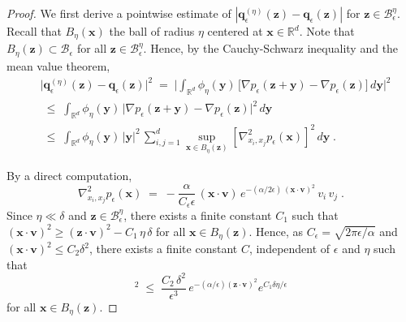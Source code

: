 \documentclass[reqno]{amsart}
\newcounter{as}[section]
\newcommand{\mc}[1]{{\mathcal #1}}
\newcommand{\bb}[1]{{\mathbb #1}}
\newcommand{\bs}[1]{{\boldsymbol #1}}
\newcommand{\<}{\langle}
\renewcommand{\>}{\rangle}
\begin{document}
\begin{proof}
We first derive a pointwise estimate of
$|\bs{q}_{\epsilon}^{(\eta)}(\bs{z}) - \bs{q}_{\epsilon}(\bs{z})|$ for
$\bs{z}\in\mc{B}_{\epsilon}^{\eta}$. Recall that $B_\eta(\bs{x})$ the
ball of radius $\eta$ centered at $\bs{x}\in\bb{R}^{d}$. Note
that $B_\eta(\bs{z})\subset\mc{B}_{\epsilon}$ for all
$\bs{z}\in\mc{B}_{\epsilon}^{\eta}$.  Hence, by the Cauchy-Schwarz
inequality and the mean value theorem,
\begin{equation}
\label{se30}
\begin{aligned}
& \big|\bs{q}_{\epsilon}^{(\eta)}(\bs{z})
-\bs{q}_{\epsilon}(\bs{z})\big|^{2} \;=\;
\Big|\int_{\bb{R}^{d}}\phi_{\eta}(\bs{y})\,
\big[\nabla p_{\epsilon}(\bs{z}+\bs{y})
-\nabla p_{\epsilon}(\bs{z})\big]\, d\bs{y}\Big|^{2} \\
&  \;\le\; \int_{\bb{R}^{d}}\phi_{\eta}(\bs{y})
\, \big|\nabla p_{\epsilon}(\bs{z}+\bs{y})
-\nabla p_{\epsilon}(\bs{z})\big|^{2}\, d\bs{y} \\
& \;\le\; \int_{\bb{R}^{d}} \phi_{\eta}(\bs{y})\, |\bs{y}|^{2}\,
\sum_{i,j=1}^d \sup_{\bs{x}\in B_\eta(\bs{z})}
[\nabla^{2}_{x_i,x_j}p_{\epsilon}(\bs{x})]^{2}\, d\bs{y}\;.
\end{aligned}
\end{equation}

By a direct computation,
\begin{equation*}
\nabla^{2}_{x_i,x_j} p_{\epsilon}(\bs{x})
\;=\;-\frac{\alpha}{C_{\epsilon}\epsilon}\,
(\bs{x}\cdot\bs{v})\,
e^{-(\alpha/2\epsilon) \, (\bs{x}\cdot\bs{v})^{2}} \, v_{i}\, v_{j}\;.
\end{equation*}
Since $\eta\ll \delta$ and $\bs z \in \mc{B}_{\epsilon}^{\eta}$, there
exists a finite constant $C_1$ such that $(\bs{x}\cdot\bs{v})^{2} \ge
(\bs{z}\cdot\bs{v})^{2} - C_1\, \eta\, \delta$ for all $\bs{x}\in
B_\eta(\bs{z})$. Hence, as $C_{\epsilon} = \sqrt{2\pi\epsilon/\alpha}$ and
$(\bs{x}\cdot\bs{v})^2 \le C_2 \delta^2$, there exists a finite constant
$C$, independent of $\epsilon$ and $\eta$ such that
\begin{equation*}
[\nabla^{2}_{x_i,x_j} p_{\epsilon}(\bs{x})]^2 \;\le\;
\frac{C_2 \, \delta^{2}}{\epsilon^{3}}\,
e^{-(\alpha/\epsilon)(\bs{z}\cdot\bs{v})^{2}}
e^{C_1\delta\eta/\epsilon}
\end{equation*}
for all $\bs x \in B_\eta(\bs{z})$.


\end{proof}
\end{document}
